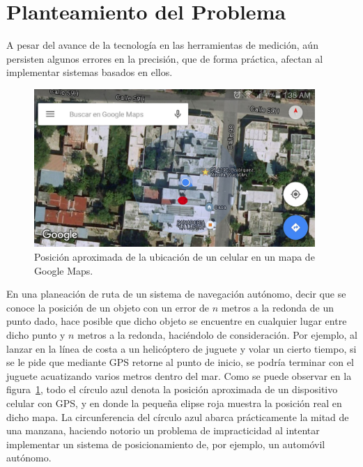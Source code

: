 \section{Planteamiento del Problema}
A pesar del avance de la tecnología en las herramientas de medición, aún persisten algunos errores en la precisión, que de forma práctica, afectan al implementar sistemas basados en ellos. \\

\begin{figure}[H]
\centering
\includegraphics[width=0.95\textwidth]{Figures/Pred}
\caption[Posición de celular en mapa.]{Posición aproximada de la ubicación de un celular en un mapa de Google Maps.}
\label{fig:Prec}
\end{figure}

En una planeación de ruta de un sistema de navegación autónomo, decir que se conoce la posición de un objeto con un error de $n$ metros a la redonda de un punto dado, hace posible que dicho objeto se encuentre en cualquier lugar entre dicho punto y $n$ metros a la redonda, haciéndolo de consideración. Por ejemplo, al lanzar en la línea de costa a un helicóptero de juguete y volar un cierto tiempo, si se le pide que mediante GPS retorne al punto de inicio, se podría terminar con el juguete acuatizando varios metros dentro del mar. Como se puede observar en la figura~\ref{fig:Prec}, todo el círculo azul denota la posición aproximada de un dispositivo celular con GPS, y en donde la pequeña elipse roja muestra la posición real en dicho mapa. La circunferencia del círculo azul abarca prácticamente la mitad de una manzana, haciendo notorio un problema de impracticidad al intentar implementar un sistema de posicionamiento de, por ejemplo, un automóvil autónomo.

